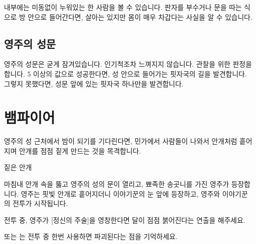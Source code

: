 \documentclass{report}
\begin{document}
	내부에는 미동없이 누워있는 한 사람을 볼 수 있습니다. 판자를 부수거나 문을 따는 식으로 방 안으로 들어간다면, 살아는 있지만 몸이 매우 차갑다는 사실을 알 수 있습니다.
	
	\subsection{영주의 성문}
	영주의 성문은 굳게 잠겨있습니다. 인기척조차 느껴지지 않습니다. 관찰을 위한 판정을 합니다. 5 이상의 값으로 성공한다면, 성 안으로 들어가는 핏자국의 길을 발견합니다. 그렇지 못했다면, 성문 앞에 있는 핏자국 하나만을 발견합니다.
	
	\section{뱀파이어}
	영주의 성 근처에서 밤이 되기를 기다린다면, 민가에서 사람들이 나와서 안개처럼 흩어지며 안개를 점점 짙게 만드는 것을 목격합니다.
	
	\begin{lite}{짙은 안개}
	\end{lite}
	
	마침내 안개 속을 뚫고 영주의 성의 문이 열리고, 뾰족한 송곳니를 가진 영주가 등장합니다. 영주는 핏빛 안개로 흩어지더니 이야기꾼의 눈 앞에 등장하고, 영주와 이야기꾼의 전투가 시작됩니다.
	
	전투 중, 영주가 [정신의 주술]을 영창한다면 달이 점점 붉어진다는 연출을 해주세요.
	
	 또는 는 전투 중 한번 사용하면 파괴된다는 점을 기억하세요.
	
\end{document}

